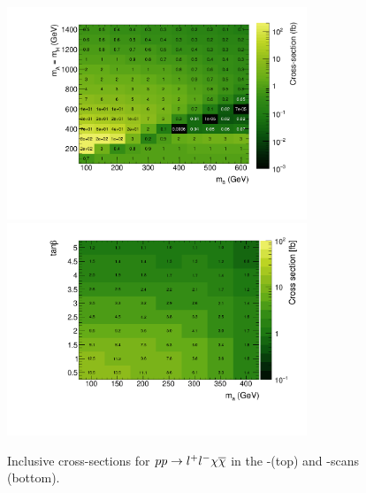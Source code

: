 \begin{figure}
\centering
\includegraphics[width=0.8\textwidth]{texinputs/04_grid/figures/monoz/leptonic/xs_2d_inclusive_26300.pdf}
\includegraphics[width=0.8\textwidth]{texinputs/04_grid/figures/monoz/leptonic/tanbma_xsec_ll.pdf}
\caption{Inclusive cross-sections for $pp\rightarrow l^{+}l^{-}\chi\overline{\chi}$ in the \ma-\mA (top) and \ma-\tanb scans (bottom).}
\label{fig:monoz_ll_xs_inclusive}
\end{figure}



